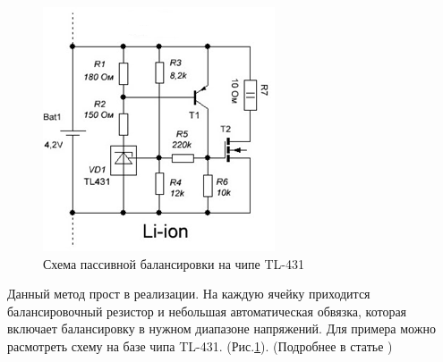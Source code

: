 \begin{figure}[!h]
    \centering
    \includegraphics[width=0.4\linewidth]{img/chem_pass_tl431.png}
    \caption{Схема пассивной балансировки на чипе TL-431}
    \label{fig:tl431}
\end{figure}

Данный метод прост в реализации. На каждую ячейку приходится балансировочный резистор 
и небольшая автоматическая обвязка, которая включает балансировку в нужном диапазоне напряжений.
Для примера можно расмотреть схему на базе чипа TL-431. (Рис.\ref{fig:tl431}). (Подробнее в статье \cite{8898267})

